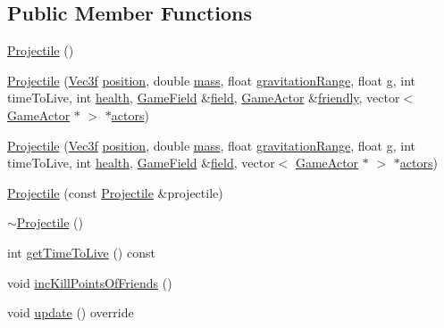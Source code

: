 \subsection*{Public Member Functions}
\begin{DoxyCompactItemize}
\item 
\hyperlink{class_projectile_ac536ed2aad56af866a2078b9a85aa16d}{Projectile} ()
\item 
\hyperlink{class_projectile_a608ed7a66fa509787307bedbdc0a7754}{Projectile} (\hyperlink{class_vec3f}{Vec3f} \hyperlink{class_game_actor_aefed3c91bf32ad388d86657b3bb9ddfa}{position}, double \hyperlink{class_game_actor_a2111233f4f0216db4d172d5088ebeed4}{mass}, float \hyperlink{class_game_actor_a9c0ba51b08a3e617d9629c0ee8d309f2}{gravitation\+Range}, float \hyperlink{class_game_actor_a42ed4bef0d99cf053ff9a025c86d34d3}{g}, int time\+To\+Live, int \hyperlink{class_game_actor_a5d402a953140585fb7cc3f8a3a24a2a4}{health}, \hyperlink{class_game_field}{Game\+Field} \&\hyperlink{class_game_actor_a0224fbc502abd6b7579787aa234332d5}{field}, \hyperlink{class_game_actor}{Game\+Actor} \&\hyperlink{class_projectile_a54dec73f149e6619fac8f5cf8910edcc}{friendly}, vector$<$ \hyperlink{class_game_actor}{Game\+Actor} $\ast$ $>$ $\ast$\hyperlink{class_game_actor_a2405618d895f5143b42ae9e94d20e693}{actors})
\item 
\hyperlink{class_projectile_ae701fc61b95ef80941fcffd2b31c6d6c}{Projectile} (\hyperlink{class_vec3f}{Vec3f} \hyperlink{class_game_actor_aefed3c91bf32ad388d86657b3bb9ddfa}{position}, double \hyperlink{class_game_actor_a2111233f4f0216db4d172d5088ebeed4}{mass}, float \hyperlink{class_game_actor_a9c0ba51b08a3e617d9629c0ee8d309f2}{gravitation\+Range}, float \hyperlink{class_game_actor_a42ed4bef0d99cf053ff9a025c86d34d3}{g}, int time\+To\+Live, int \hyperlink{class_game_actor_a5d402a953140585fb7cc3f8a3a24a2a4}{health}, \hyperlink{class_game_field}{Game\+Field} \&\hyperlink{class_game_actor_a0224fbc502abd6b7579787aa234332d5}{field}, vector$<$ \hyperlink{class_game_actor}{Game\+Actor} $\ast$ $>$ $\ast$\hyperlink{class_game_actor_a2405618d895f5143b42ae9e94d20e693}{actors})
\item 
\hyperlink{class_projectile_a7bdfb6d482c18c62594d431c14512148}{Projectile} (const \hyperlink{class_projectile}{Projectile} \&projectile)
\item 
\hyperlink{class_projectile_a94903e021fa2edab60ba3836ca0b937d}{$\sim$\+Projectile} ()
\item 
int \hyperlink{class_projectile_aa565568bc9ac03608c39092b653b082e}{get\+Time\+To\+Live} () const 
\item 
void \hyperlink{class_projectile_a387fe8b69d5de229b8f26d21856cf463}{inc\+Kill\+Points\+Of\+Friends} ()
\item 
void \hyperlink{class_projectile_ac41ad56034b53e739619fabbd5e49652}{update} () override
\end{DoxyCompactItemize}
